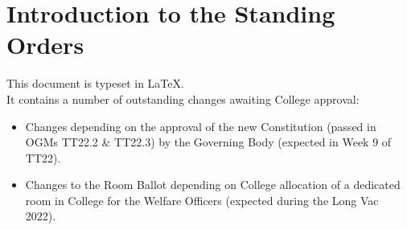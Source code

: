 \chapter{Introduction to the Standing Orders}
This document is typeset in \LaTeX.
\\
It contains a number of outstanding changes awaiting College approval:
\begin{itemize}
    \item Changes depending on the approval of the new Constitution (passed in OGMs TT22.2 \& TT22.3) by the Governing Body (expected in Week 9 of TT22).
    \item Changes to the Room Ballot depending on College allocation of a dedicated room in College for the Welfare Officers (expected during the Long Vac 2022).
\end{itemize}
